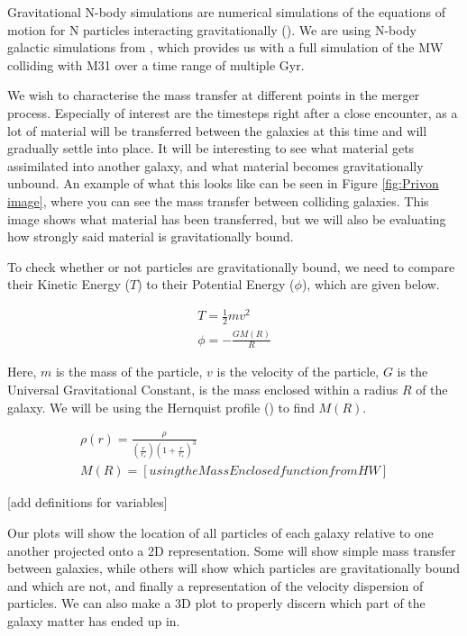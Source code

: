 \documentclass[linenumbers]{aastex631} %
\begin{document}
Gravitational N-body simulations are numerical simulations of the equations of motion for N particles interacting gravitationally (\citep{trenti2008gravitational}). We are using N-body galactic simulations from \citep{Besla}, which provides us with a full simulation of the MW colliding with M31 over a time range of multiple Gyr. 

We wish to characterise the mass transfer at different points in the merger process. Especially of interest are the timesteps right after a close encounter, as a lot of material will be transferred between the galaxies at this time and will gradually settle into place. It will be interesting to see what material gets assimilated into another galaxy, and what material becomes gravitationally unbound. An example of what this looks like can be seen in Figure \ref{fig:Privon image}, where you can see the mass transfer between colliding galaxies. This image shows what material has been transferred, but we will also be evaluating how strongly said material is gravitationally bound. 


To check whether or not particles are gravitationally bound, we need to compare their Kinetic Energy ($T$) to their Potential Energy ($\phi$), which are given below.

\begin{gather}
T = \frac{1}{2} mv^2 \\
\phi = -\frac{GM(R)}{R}
\end{gather}

Here, $m$ is the mass of the particle, $v$ is the velocity of the particle, $G$ is the Universal Gravitational Constant,  is the mass enclosed within a radius $R$ of the galaxy. We will be using the Hernquist profile (\citep{1990ApJ...356..359H}) to find $M(R)$.

\begin{gather}
    \rho(r) = \frac{\rho}{(\frac{r}{r_s})(1+\frac{r}{r_s})^3} \\
    M(R) = [using the MassEnclosed function from HW]
\end{gather}

[add definitions for variables]

Our plots will show the location of all particles of each galaxy relative to one another projected onto a 2D representation. Some will show simple mass transfer between galaxies, while others will show which particles are gravitationally bound and which are not, and finally a representation of the velocity dispersion of particles. We can also make a 3D plot to properly discern which part of the galaxy matter has ended up in.
\end{document}
